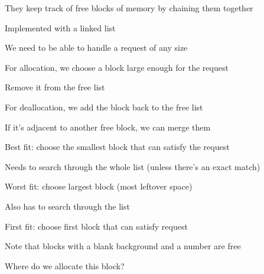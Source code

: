 \begin{slide}


    They keep track of free blocks of memory by chaining them together

    \leftspace{}Implemented with a linked list
    \medskip

    We need to be able to handle a request of any size
    \medskip

    For allocation, we choose a block large enough for the request

    \leftspace{}Remove it from the free list
    \medskip

    For deallocation, we add the block back to the free list

    \leftspace{}If it's adjacent to another free block, we can merge them

\end{slide}

\begin{slide}


    Best fit: choose the smallest block that can satisfy the request

    \leftspace{}Needs to search through the whole list (unless there's an
    exact match)
    \medskip

    Worst fit: choose largest block (most leftover space)

    \leftspace{}Also has to search through the list
    \medskip
    
    First fit: choose first block that can satisfy request
\end{slide}

\begin{slide}
    

    Note that blocks with a blank background and a number are free
    \medskip


    Where do we allocate this block?
\end{slide}

